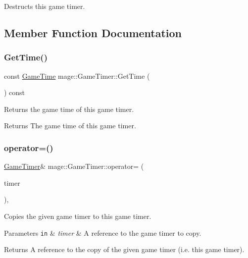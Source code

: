 Destructs this game timer. 

\subsection{Member Function Documentation}
\hypertarget{classmage_1_1_game_timer_a5883ab785122b5722ec11045e146ff18}{}\label{classmage_1_1_game_timer_a5883ab785122b5722ec11045e146ff18} 
\subsubsection{\texorpdfstring{Get\+Time()}{GetTime()}}
{\footnotesize\ttfamily const \hyperlink{classmage_1_1_game_time}{Game\+Time} mage\+::\+Game\+Timer\+::\+Get\+Time (\begin{DoxyParamCaption}{ }\end{DoxyParamCaption}) const\hspace{0.3cm}{\ttfamily [noexcept]}}

Returns the game time of this game timer.

\begin{DoxyReturn}{Returns}
The game time of this game timer. 
\end{DoxyReturn}
\hypertarget{classmage_1_1_game_timer_a9465e2d38d8810c2acb2cde2aafeaad1}{}\label{classmage_1_1_game_timer_a9465e2d38d8810c2acb2cde2aafeaad1} 
\subsubsection{\texorpdfstring{operator=()}{operator=()}\hspace{0.1cm}{\footnotesize\ttfamily [1/2]}}
{\footnotesize\ttfamily \hyperlink{classmage_1_1_game_timer}{Game\+Timer}\& mage\+::\+Game\+Timer\+::operator= (\begin{DoxyParamCaption}\item[{const \hyperlink{classmage_1_1_game_timer}{Game\+Timer} \&}]{timer }\end{DoxyParamCaption})\hspace{0.3cm}{\ttfamily [default]}, {\ttfamily [noexcept]}}

Copies the given game timer to this game timer.


\begin{DoxyParams}[1]{Parameters}
\mbox{\tt in}  & {\em timer} & A reference to the game timer to copy. \\
\hline
\end{DoxyParams}
\begin{DoxyReturn}{Returns}
A reference to the copy of the given game timer (i.\+e. this game timer). 
\end{DoxyReturn}
\hypertarget{classmage_1_1_game_timer_ae5489a5363fbf69592270a9f35f269c9}{}\label{classmage_1_1_game_timer_ae5489a5363fbf69592270a9f35f269c9} 
